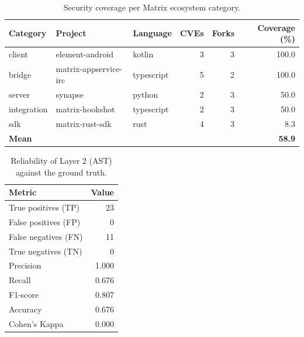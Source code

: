 \begin{table}[ht]\centering
\caption{Security coverage per Matrix ecosystem category.}
\label{tab:cobertura}
\begin{tabular}{lllrrr}
\hline
Category & Project & Language & CVEs & Forks & Coverage (\%) \\ \hline
client & element-android & kotlin & 3 & 3 & 100.0 \\
bridge & matrix-appservice-irc & typescript & 5 & 2 & 100.0 \\
server & synapse & python & 2 & 3 & 50.0 \\
integration & matrix-hookshot & typescript & 2 & 3 & 50.0 \\
sdk & matrix-rust-sdk & rust & 4 & 3 & 8.3 \\
\hline
\textbf{Mean} & & & & & \textbf{58.9} \\
\hline
\end{tabular}
\end{table}

\begin{table}[ht]\centering
\caption{Reliability of Layer 2 (AST) against the ground truth.}
\label{tab:metricas}
\begin{tabular}{lr}
\hline
Metric & Value \\ \hline
True positives (TP) & 23 \\
False positives (FP) & 0 \\
False negatives (FN) & 11 \\
True negatives (TN) & 0 \\
Precision & 1.000 \\
Recall & 0.676 \\
F1-score & 0.807 \\
Accuracy & 0.676 \\
Cohen's Kappa & 0.000 \\
\hline
\end{tabular}
\end{table}
